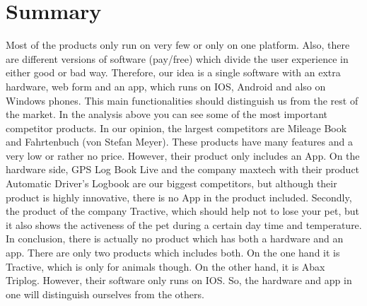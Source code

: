 \section{Summary}
Most of the products only run on very few or only on one platform. Also, there are different versions of software (pay/free) which divide the user experience in either good or bad way. Therefore, our idea is a single software with an extra hardware, web form and an app, which runs on IOS, Android and also on Windows phones. This main functionalities should distinguish us from the rest of the market. 
\newline\newline
In the analysis above you can see some of the most important competitor products. In our opinion, the largest competitors are Mileage Book and Fahrtenbuch (von Stefan Meyer). These products have many features and a very low or rather no price. However, their product only includes an App.
On the hardware side, GPS Log Book Live and the company maxtech with their product Automatic Driver’s Logbook are our biggest competitors, but although their product is highly innovative, there is no App in the product included. Secondly, the product of the company Tractive, which should help not to lose your pet, but it also shows the activeness of the pet during a certain day time and temperature.
\newline\newline
In conclusion, there is actually no product which has both a hardware and an app. There are only two products which includes both. On the one hand it is Tractive, which is only for animals though. On the other hand, it is Abax Triplog. However, their software only runs on IOS. So, the hardware and app in one will distinguish ourselves from the others.
\newline\newline

